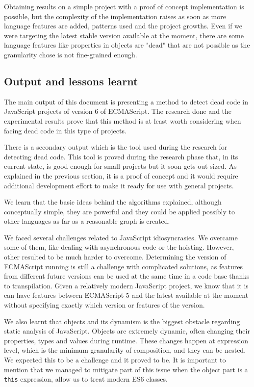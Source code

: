 \documentclass{uvamscse}
\begin{document}
Obtaining results on a simple project with a proof of concept implementation is possible, but the complexity of the implementation raises as soon as more language features are added, patterns used and the project growths. Even if we were targeting the latest stable version available at the moment, there are some language features like properties in objects are "dead" that are not possible as the granularity chose is not fine-grained enough.

\subsection{Output and lessons learnt}
The main output of this document is presenting a method to detect dead code in JavaScript projects of version 6 of ECMAScript. The research done and the experimental results prove that this method is at least worth considering when facing dead code in this type of projects.

There is a secondary output which is the tool used during the research for detecting dead code. This tool is proved during the research phase that, in its current state, is good enough for small projects but it soon gets out sized. As explained in the previous section, it is a proof of concept and it would require additional development effort to make it ready for use with general projects.

We learn that the basic ideas behind the algorithms explained, although conceptually simple, they are powerful and they could be applied possibly to other languages as far as a reasonable graph is created.

We faced several challenges related to JavaScript idiosyncrasies. We overcame some of them, like dealing with asynchronous code or the hoisting. However, other resulted to be much harder to overcome. Determining the version of ECMAScript running is still a challenge with complicated solutions, as features from different future versions can be used at the same time in a code base thanks to transpilation. Given a relatively modern JavaScript project, we know that it is can have features between ECMAScript 5 and the latest available at the moment without specifying exactly which version or features of the version.

We also learnt that objects and its dynamism is the biggest obstacle regarding static analysis of JavaScript. Objects are extremely dynamic, often changing their properties, types and values during runtime. These changes happen at expression level, which is the minimum granularity of composition, and they can be nested. We expected this to be a challenge and it proved to be. It is important to mention that we managed to mitigate part of this issue when the object part is a \texttt{this} expression, allow us to treat modern ES6 classes.
\end{document}

